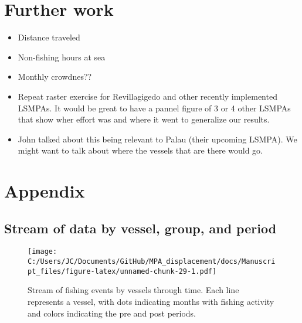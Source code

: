 \documentclass[11pt,]{article}
\providecommand{\tightlist}{%
  \setlength{\itemsep}{0pt}\setlength{\parskip}{0pt}}
\begin{document}
\hypertarget{further-work}{%
\section{Further work}\label{further-work}}

\begin{itemize}
\tightlist
\item
  Distance traveled
\item
  Non-fishing hours at sea
\item
  Monthly crowdnes??
\item
  Repeat raster exercise for Revillagigedo and other recently
  implemented LSMPAs. It would be great to have a pannel figure of 3 or
  4 other LSMPAs that show wher effort was and where it went to
  generalize our results.
\item
  John talked about this being relevant to Palau (their upcoming LSMPA).
  We might want to talk about where the vessels that are there would go.
\end{itemize}



\clearpage

\hypertarget{appendix}{%
\section{Appendix}\label{appendix}}

\setcounter{table}{0}  \renewcommand{\thetable}{S\arabic{table}} \setcounter{figure}{0} \renewcommand{\thefigure}{S\arabic{figure}}

\hypertarget{stream-of-data-by-vessel-group-and-period}{%
\subsection{Stream of data by vessel, group, and
period}\label{stream-of-data-by-vessel-group-and-period}}

\begin{figure}
\centering
\texttt{[image: C:/Users/JC/Documents/GitHub/MPA\_displacement/docs/Manuscript\_files/figure-latex/unnamed-chunk-29-1.pdf]}
\caption{\label{fig:unnamed-chunk-29}\label{fig:baci_strict}Stream of
fishing events by vessels through time. Each line represents a vessel,
with dots indicating months with fishing activity and colors indicating
the pre and post periods.}
\end{figure}

\clearpage
\end{document}

